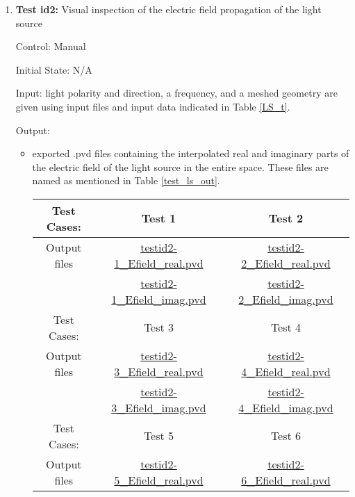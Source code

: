 \documentclass[12pt, titlepage]{article}
\begin{document}
\begin{enumerate}
	
	
	\newpage
	\item{\textbf{Test id2:}  Visual inspection of the electric field propagation of the light source\\}
	
	Control: Manual
	
	Initial State: N/A
	
	Input: light polarity and direction, a frequency, and a meshed geometry are given using input files and input data indicated in Table \ref{LS_t}. 

	
	Output: 
	\begin{itemize}
		\item exported .pvd files containing the interpolated real and imaginary parts of the electric field of the light source in the entire space. These files are named as mentioned in Table \ref{test_ls_out}.
			\begin{table}
			\centering
			\begin{tabular}{|c|c|c|}
				\hline
				Test Cases: & Test 1 & Test 2 \\
				\hline 
				Output files & \href{https://github.com/shmouses/SPDFM/tree/master/src/Test Output}{testid2-1\_Efield\_real.pvd} & \href{https://github.com/shmouses/SPDFM/tree/master/src/Test Output}{testid2-2\_Efield\_real.pvd}\\
				
				 &
			    \href{https://github.com/shmouses/SPDFM/tree/master/src/Test Output}{testid2-1\_Efield\_imag.pvd} & \href{https://github.com/shmouses/SPDFM/tree/master/src/Test Output}{testid2-2\_Efield\_imag.pvd} \\
			    \hline
			    
			    Test Cases: & Test 3 & Test 4\\
			    \hline 
			    Output files & \href{https://github.com/shmouses/SPDFM/tree/master/src/Test Output}{testid2-3\_Efield\_real.pvd} & \href{https://github.com/shmouses/SPDFM/tree/master/src/Test Output}{testid2-4\_Efield\_real.pvd} \\
			    
			    & \href{https://github.com/shmouses/SPDFM/tree/master/src/Test Output}{testid2-3\_Efield\_imag.pvd} & \href{https://github.com/shmouses/SPDFM/tree/master/src/Test Output}{testid2-4\_Efield\_imag.pvd}\\
			    \hline
			    
			    Test Cases:& Test 5 & Test 6\\
			    \hline 
			    Output files & \href{https://github.com/shmouses/SPDFM/tree/master/src/Test Output}{testid2-5\_Efield\_real.pvd} & \href{https://github.com/shmouses/SPDFM/tree/master/src/Test Output}{testid2-6\_Efield\_real.pvd}\\
			    

\end{tabular}
\end{table}
\end{itemize}
\end{enumerate}
\end{document}

